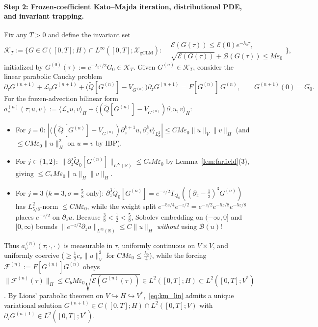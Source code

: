 \documentclass[11pt,a4paper]{article}
\begin{document}
\paragraph{Step 2: Frozen-coefficient Kato--Majda iteration, distributional PDE, and invariant trapping.}
Fix any $T > 0$ and define the invariant set
\[
\mathcal{K}_T := \Big\{G \in C([0,T]; H) \cap L^\infty([0,T]; \mathcal{X}_{\mathrm{gCLM}}) :
\begin{aligned}
&\mathcal{E}(G(\tau)) \le \mathcal{E}(0)e^{-\lambda_0\tau},\\
&\sqrt{\mathcal{E}(G(\tau))} + \mathcal{B}(G(\tau)) \le M\varepsilon_0
\end{aligned}
\Big\},
\]
initialized by $G^{(0)}(\tau) := e^{-\lambda_0\tau/2}G_0 \in \mathcal{K}_T$. Given $G^{(n)} \in \mathcal{K}_T$, consider the linear parabolic Cauchy problem
\begin{equation}\label{eq:km_lin}
\partial_\tau G^{(n+1)} + \mathcal{L}_\nu G^{(n+1)} + \big(\widetilde{Q}[G^{(n)}] - V_{G^{(n)}}\big)\partial_z G^{(n+1)} = F[G^{(n)}]\,G^{(n)}, \qquad G^{(n+1)}(0) = G_0.
\end{equation}
For the frozen-advection bilinear form $a_\nu^{(n)}(\tau; u, v) := \langle \mathcal{L}_\nu u, v\rangle_H + \langle (\widetilde{Q}[G^{(n)}] - V_{G^{(n)}})\partial_z u, v\rangle_H$:
\begin{itemize}
  \item For $j = 0$: $|\langle (\widetilde{Q}[G^{(n)}] - V_{G^{(n)}})\partial_z^{k+1}u, \partial_z^k v\rangle_{L^2_\sigma}| \le C M\varepsilon_0\|u\|_V\|v\|_H$ (and $\le C M\varepsilon_0\|u\|_H^2$ on $u = v$ by IBP).
  \item For $j \in \{1, 2\}$: $\|\partial_z^j\widetilde{Q}_0[G^{(n)}]\|_{L^\infty(\mathbb{R})} \le C_* M\varepsilon_0$ by Lemma~\ref{lem:farfield}(3), giving $\le C_* M\varepsilon_0\|u\|_H\|v\|_H$.
  \item For $j = 3$ ($k = 3, \sigma = \frac{5}{8}$ only): $\partial_z^3\widetilde{Q}_0[G^{(n)}] = e^{-z/2}T_{Q_0}((\partial_z-\frac{1}{2})^3 G^{(n)})$ has $L^2_{5/8}$-norm $\le C M\varepsilon_0$, while the weight split $e^{-5z/4}e^{-z/2} = e^{-z/2}e^{-5z/8}e^{-5z/8}$ places $e^{-z/2}$ on $\partial_z u$. Because $\frac{3}{8} < \frac{1}{2} < \frac{5}{8}$, Sobolev embedding on $(-\infty,0]$ and $[0,\infty)$ bounds $\|e^{-z/2}\partial_z u\|_{L^\infty(\mathbb{R})} \le C\|u\|_H$ \emph{without} using $\mathcal{B}(u)$!
\end{itemize}
Thus $a_\nu^{(n)}(\tau; \cdot, \cdot)$ is measurable in $\tau$, uniformly continuous on $V \times V$, and uniformly coercive ($\ge \frac{1}{2}c_\nu\|u\|_V^2$ for $C M\varepsilon_0 \le \frac{\lambda_0}{4}$), while the forcing $\mathcal{F}^{(n)} := F[G^{(n)}]G^{(n)}$ obeys $\|\mathcal{F}^{(n)}(\tau)\|_H \le C_b M\varepsilon_0\sqrt{\mathcal{E}(G^{(n)}(\tau))} \in L^2([0,T]; H) \subset L^2([0,T]; V^*)$. By Lions' parabolic theorem on $V \hookrightarrow H \hookrightarrow V^*$,~\eqref{eq:km_lin} admits a unique variational solution $G^{(n+1)} \in C([0,T]; H) \cap L^2([0,T]; V)$ with $\partial_\tau G^{(n+1)} \in L^2([0,T]; V^*)$.
\end{document}
